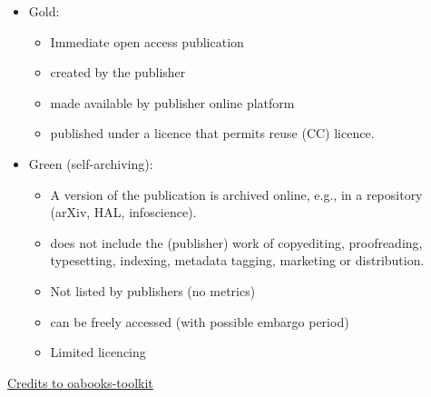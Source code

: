 \documentclass[10pt,compress,serif,aspectratio=169]{beamer}
\begin{document}
\begin{frame}[t]%
 \vskip1cm%

 
 \begin{itemize}
 \item Gold:
   \begin{itemize}
   \item Immediate open access publication
   \item created by the publisher
   \item made available by publisher online platform
   \item published under a licence that permits reuse (CC) licence.
   \end{itemize}
 \item Green (self-archiving):
   \begin{itemize}
   \item A version of the publication is archived online, e.g., in a repository (arXiv, HAL, infoscience).
   \item does not include the (publisher) work of copyediting, proofreading, typesetting, indexing, metadata tagging, marketing or distribution.
   \item Not listed by publishers (no metrics)
   \item can be freely accessed (with possible embargo period)
   \item Limited licencing
   \end{itemize}


 \end{itemize}
 \vfill
\href{ https://oabooks-toolkit.org/lifecycle/article/13868103-green-gold-diamond-different-models-for-open-access-books}{Credits to oabooks-toolkit}

\end{frame} 
\end{document}

